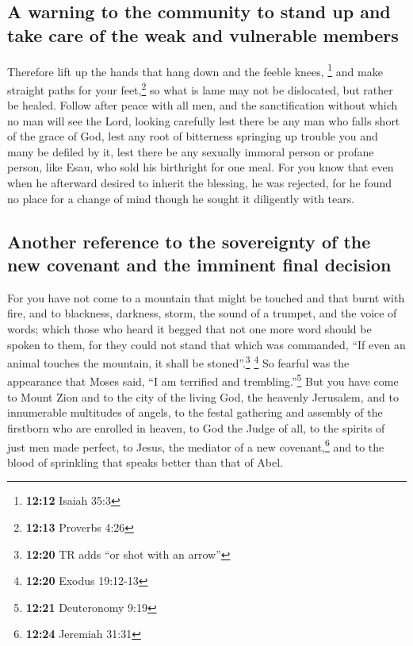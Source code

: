 \hypertarget{a-warning-to-the-community-to-stand-up-and-take-care-of-the-weak-and-vulnerable-members}{%
\subsection{A warning to the community to stand up and take care of the
weak and vulnerable
members}\label{a-warning-to-the-community-to-stand-up-and-take-care-of-the-weak-and-vulnerable-members}}

 Therefore lift up the hands that hang down and the
feeble knees, \footnote{\textbf{12:12} Isaiah 35:3}  and
make straight paths for your feet,\footnote{\textbf{12:13} Proverbs 4:26}
so what is lame may not be dislocated, but rather be healed.
 Follow after peace with all men, and the sanctification
without which no man will see the Lord,  looking
carefully lest there be any man who falls short of the grace of God,
lest any root of bitterness springing up trouble you and many be defiled
by it,  lest there be any sexually immoral person or
profane person, like Esau, who sold his birthright for one meal.
 For you know that even when he afterward desired to
inherit the blessing, he was rejected, for he found no place for a
change of mind though he sought it diligently with tears.

\hypertarget{another-reference-to-the-sovereignty-of-the-new-covenant-and-the-imminent-final-decision}{%
\subsection{Another reference to the sovereignty of the new covenant and
the imminent final
decision}\label{another-reference-to-the-sovereignty-of-the-new-covenant-and-the-imminent-final-decision}}

 For you have not come to a mountain that might be
touched and that burnt with fire, and to blackness, darkness, storm,
 the sound of a trumpet, and the voice of words; which
those who heard it begged that not one more word should be spoken to
them,  for they could not stand that which was commanded,
``If even an animal touches the mountain, it shall be
stoned''.\footnote{\textbf{12:20} TR adds ``or shot with an arrow''}
\footnote{\textbf{12:20} Exodus 19:12-13}  So fearful was
the appearance that Moses said, ``I am terrified and
trembling.''\footnote{\textbf{12:21} Deuteronomy 9:19} 
But you have come to Mount Zion and to the city of the living God, the
heavenly Jerusalem, and to innumerable multitudes of angels,
 to the festal gathering and assembly of the firstborn
who are enrolled in heaven, to God the Judge of all, to the spirits of
just men made perfect,  to Jesus, the mediator of a new
covenant,\footnote{\textbf{12:24} Jeremiah 31:31} and to the blood of
sprinkling that speaks better than that of Abel.


